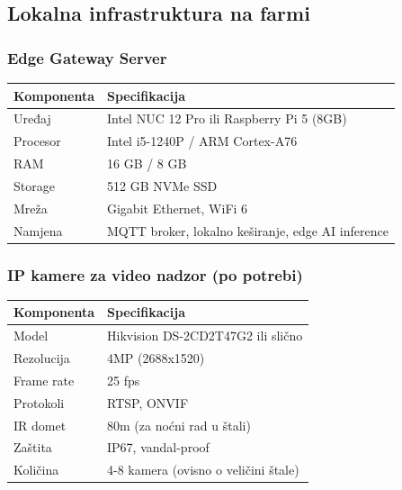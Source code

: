 \documentclass{article}
\begin{document}
\subsection{Lokalna infrastruktura na farmi}

\subsubsection{Edge Gateway Server}

\begin{center}
\begin{tabular}{|l|l|}
\hline
\rowcolor{lightgray}
\textbf{Komponenta} & \textbf{Specifikacija} \\
\hline
Uređaj & Intel NUC 12 Pro ili Raspberry Pi 5 (8GB) \\
\hline
Procesor & Intel i5-1240P / ARM Cortex-A76 \\
\hline
RAM & 16 GB / 8 GB \\
\hline
Storage & 512 GB NVMe SSD \\
\hline
Mreža & Gigabit Ethernet, WiFi 6 \\
\hline
Namjena & MQTT broker, lokalno keširanje, edge AI inference \\
\hline
\end{tabular}
\end{center}

\subsubsection{IP kamere za video nadzor (po potrebi)}

\begin{center}
\begin{tabular}{|l|l|}
\hline
\rowcolor{lightgray}
\textbf{Komponenta} & \textbf{Specifikacija} \\
\hline
Model & Hikvision DS-2CD2T47G2 ili slično \\
\hline
Rezolucija & 4MP (2688x1520) \\
\hline
Frame rate & 25 fps \\
\hline
Protokoli & RTSP, ONVIF \\
\hline
IR domet & 80m (za noćni rad u štali) \\
\hline
Zaštita & IP67, vandal-proof \\
\hline
Količina & 4-8 kamera (ovisno o veličini štale) \\
\hline
\end{tabular}
\end{center}
\end{document}
